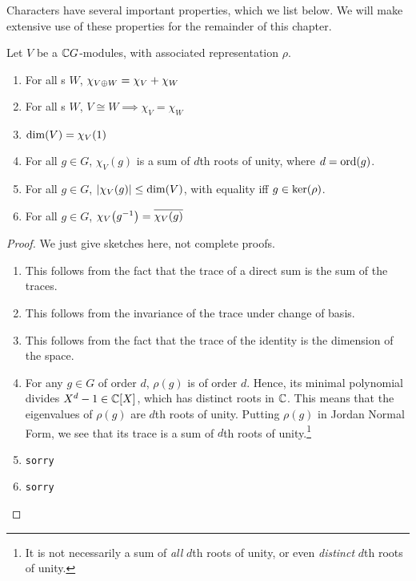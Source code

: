 Characters have several important properties, which we list below. We will make extensive use of these properties for the remainder of this chapter.

\begin{proposition} \label{Ch2:Prop:Bhv_Char}
    Let $V$ be a $\mathbb{C} G$-modules, with associated representation $\rho$.
    \begin{enumerate}[label = \normalfont \arabic*., noitemsep]
        \item For all \CGM s $W$, $\chi_{V \oplus W} = \chi_V + \chi_W$
        \item  For all \CGM s $W$, $V \cong W \implies \chi_V = \chi_W$
        \item $\dim\!\left( V \right) = \chi_V(1)$
        \item For all $g \in G$, $\chi_V(g)$ is a sum of $d$th roots of unity, where $d = \operatorname{ord}\!\left( g \right)$.
        \item For all $g \in G$, $\left\lvert \chi_V(g) \right\rvert \leq \dim\!\left( V \right)$, with equality iff $g \in \operatorname{ker}\!\left( \rho \right)$.
        \item For all $g \in G$, $\chi_V\!\left( g^{-1} \right) = \overline{\chi_V(g)}$
    \end{enumerate}
\end{proposition}
\begin{proof}
    We just give sketches here, not complete proofs.
    \begin{enumerate}[noitemsep]
        \item This follows from the fact that the trace of a direct sum is the sum of the traces.
        \item This follows from the invariance of the trace under change of basis.
        \item This follows from the fact that the trace of the identity is the dimension of the space.
        \item For any $g \in G$ of order $d$, $\rho(g)$ is of order $d$. Hence, its minimal polynomial divides $X^d - 1 \in \mathbb{C}[X]$, which has distinct roots in $\mathbb{C}$. This means that the eigenvalues of $\rho(g)$ are $d$th roots of unity. Putting $\rho(g)$ in Jordan Normal Form, we see that its trace is a sum of $d$th roots of unity.\footnote{It is not necessarily a sum of \textit{all} $d$th roots of unity, or even \textit{distinct} $d$th roots of unity.}
        \item \verb|sorry|
        \item \verb|sorry|
    \end{enumerate}
\end{proof}

